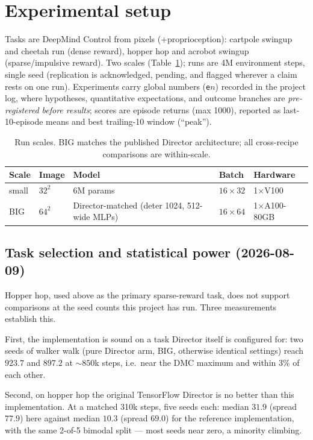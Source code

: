 \documentclass[10pt]{article}
\begin{document}
\section{Experimental setup}

Tasks are DeepMind Control from pixels (+proprioception): cartpole swingup and
cheetah run (dense reward), hopper hop and acrobot swingup (sparse/impulsive
reward). Two scales (Table~\ref{tab:scales}); runs are 4M environment steps,
single seed (replication is acknowledged, pending, and flagged wherever a
claim rests on one run). Experiments carry global numbers (\texttt{e}$n$)
recorded in the project log, where hypotheses, quantitative expectations, and
outcome branches are \emph{pre-registered before results}; scores are episode
returns (max 1000), reported as last-10-episode means and best trailing-10
window (``peak'').

\begin{table}[h]
\centering\small
\begin{tabular}{lllll}
\toprule
Scale & Image & Model & Batch & Hardware \\
\midrule
small & $32^2$ & 6M params & $16\times32$ & 1$\times$V100 \\
BIG & $64^2$ & Director-matched (deter 1024, 512-wide MLPs) & $16\times64$ & 1$\times$A100-80GB \\
\bottomrule
\end{tabular}
\caption{Run scales. BIG matches the published Director architecture; all
cross-recipe comparisons are within-scale.}
\label{tab:scales}
\end{table}

\subsection{Task selection and statistical power (2026-08-09)}
\label{sec:power}
Hopper hop, used above as the primary sparse-reward task, does not support
comparisons at the seed counts this project has run. Three measurements
establish this.

First, the implementation is sound on a task Director itself is configured
for: two seeds of walker walk (pure Director arm, BIG, otherwise identical
settings) reach $923.7$ and $897.2$ at ${\sim}850$k steps, i.e.\ near the DMC
maximum and within $3\%$ of each other.

Second, on hopper hop the original TensorFlow Director is no better than this
implementation. At a matched 310k steps, five seeds each: median $31.9$
(spread $77.9$) here against median $10.3$ (spread $69.0$) for the reference
implementation, with the same 2-of-5 bimodal split --- most seeds near zero,
a minority climbing.
\end{document}
